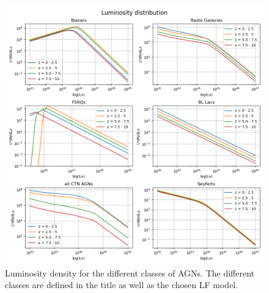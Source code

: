 \begin{figure}
    \centering
    \includegraphics[width = \textwidth]{new_plots/Luminosity density.png}
    \caption{Luminosity density for the  different classes of AGNs. The different classes are defined in the title as well as the chosen LF model.}
    \label{fig:LD}
\end{figure}


